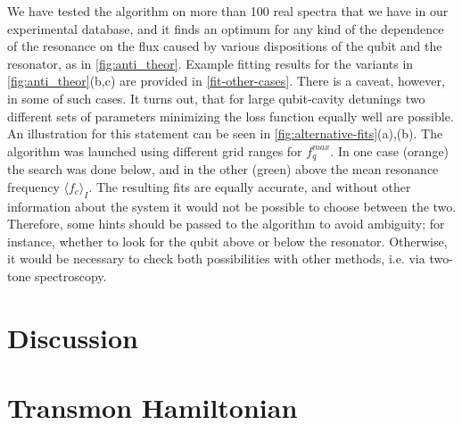 \documentclass[%
 aip,
 amsmath,amssymb,
 reprint,%
]{revtex4-1}
\begin{document}
We have tested the algorithm on more than 100 real spectra that we have in our experimental database, and it finds an optimum for any kind of the dependence of the resonance on the flux caused by various dispositions of the qubit and the resonator, as in \autoref{fig:anti_theor}. Example fitting results for the variants in \autoref{fig:anti_theor}(b,c) are provided in \autoref{fit-other-cases}. There is a caveat, however, in some of such cases. It turns out, that for large qubit-cavity detunings two different sets of parameters minimizing the loss function equally well are possible. An illustration for this statement can be seen in \autoref{fig:alternative-fits}(a),(b). The algorithm was launched using different grid ranges for $f_q^{max}$. In one case (orange) the search was done below, and in the other (green) above the mean resonance frequency $\langle f_c\rangle_{I}$. The resulting fits are equally accurate, and without other information about the system it would not be possible to choose between the two. Therefore, some hints should be passed to the algorithm to avoid ambiguity; for instance, whether to look for the qubit above or below the resonator. Otherwise, it would be necessary to check both possibilities with other methods, i.e. via two-tone spectroscopy.

\section{Discussion}



\appendix



\section{Transmon Hamiltonian}\label{sec:transmon}
\end{document}
